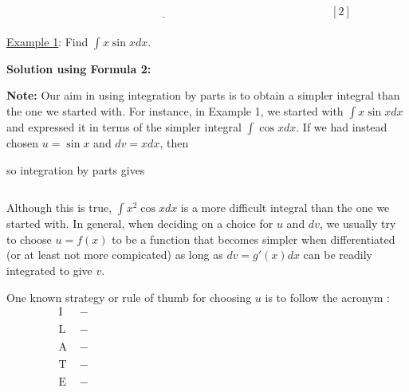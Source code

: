 \documentclass[paper=a4, fontsize=11pt]{scrartcl} %
\numberwithin{equation}{section} %
\numberwithin{figure}{section} %
\numberwithin{table}{section} %
\newcommand{\ds}{\displaystyle}
\begin{document}
\indent\\
\indent\\
\[\underline{\hspace{3in}} \hspace{1in} [2]\]
\indent\\
\newpage
\underline{Example 1}: Find $\ds\int x\sin x dx$.\\
\indent

\textbf{Solution using Formula 2:}\\
\indent

\vspace{2in}


\textbf{Note:} Our aim in using integration by parts is to obtain a simpler integral than the one we started with. For instance, in Example 1, we started with $\ds\int x\sin x dx$ and expressed it in terms of the simpler integral $\ds\int \cos x dx$. If we had instead chosen $u=\sin x$ and $dv = x dx$, then

\[\text{ }\]
so integration by parts gives

\[\text{ }\]
\indent

Although this is true, $\ds\int x^2\cos x dx$ is a more difficult integral than the one we started with. In general, when deciding on a choice for $u$ and $dv$, we usually try to choose $u=f(x)$ to be a function that becomes simpler when differentiated (or at least not more compicated) as long as $dv = g'(x)dx$ can be readily integrated to give $v$.\\
\indent

One known strategy or rule of thumb for choosing $u$ is to follow the acronym \underline{\hspace{1in}}:
\begin{align*}
\text{I } &- \hspace{4in}\\
\text{ } &\\
\text{L } &- \hspace{4in}\\
\text{ } &\\
\text{A } &- \hspace{4in}\\
\text{ } &\\
\text{T } &- \hspace{4in}\\
\text{ } &\\
\text{E } &- \hspace{4in}
\end{align*}
\end{document}
